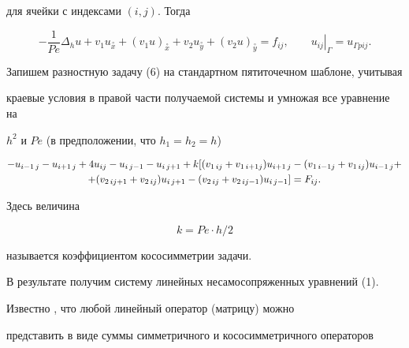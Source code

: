 для ячейки с индексами $(i,j)$. Тогда 


\begin{equation} 


-\frac{1}{Pe}\Delta_h u+v_1 u_{\overset\circ x} 


+(v_1 u)_{\overset\circ x}+v_2 u_{\overset\circ y}+ 


(v_2 u)_{\overset\circ y}=f_{ij},\qquad \left. u_{ij}\right|_\Gamma 


=u_{\Gamma pij}. 


\end{equation} 


Запишем разностную задачу (6) на стандартном пятиточечном шаблоне, учитывая 


краевые условия в правой части получаемой системы и умножая все уравнение на 


$h^2$ и $Pe$ (в предположении, что $h_1=h_2=h$) 


\begin{gather} 


-u_{i-1\,j}-u_{i+1\,j}+4u_{ij}-u_{i\,j-1}-u_{i\,j+1}+


k[(v_{1\,ij}+v_{1\,i+1j})u_{i+1\,j}-(v_{1\,i-1j}+v_{1\,ij}) 


u_{i-1\,j}+\notag\\


+(v_{2\,ij+1}+v_{2\,ij})u_{i\,j+1}- 


(v_{2\,ij}+v_{2\,ij-1})u_{i\,j-1}]=F_{ij}. 


\end{gather} 


 


Здесь величина 


\begin{equation} 


k=Pe\cdot h/2 


\end{equation} 


называется коэффициентом кососимметрии задачи. 


 


В результате получим систему линейных несамосопряженных уравнений (1). 


 


Известно \cite{Sam}, что любой линейный оператор (матрицу) можно 


представить в виде суммы симметричного и кососимметричного операторов 


